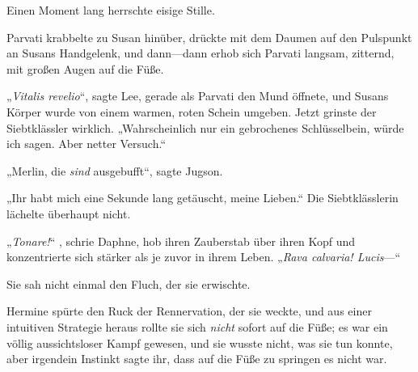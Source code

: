 Einen Moment lang herrschte eisige Stille.

Parvati krabbelte zu Susan hinüber, drückte mit dem Daumen auf den Pulspunkt an Susans Handgelenk, und dann—dann erhob sich Parvati langsam, zitternd, mit großen Augen auf die Füße.

„\emph{Vitalis revelio}“, sagte Lee, gerade als Parvati den Mund öffnete, und Susans Körper wurde von einem warmen, roten Schein umgeben. Jetzt grinste der Siebtklässler wirklich. „Wahrscheinlich nur ein gebrochenes Schlüsselbein, würde ich sagen. Aber netter Versuch.“

„Merlin, die \emph{sind} ausgebufft“, sagte Jugson.

„Ihr habt mich eine Sekunde lang getäuscht, meine Lieben.“ Die Siebtklässlerin lächelte überhaupt nicht.

„\emph{Tonare!}“ , schrie Daphne, hob ihren Zauberstab über ihren Kopf und konzentrierte sich stärker als je zuvor in ihrem Leben. „\emph{Rava calvaria! Lucis}—“

Sie sah nicht einmal den Fluch, der sie erwischte.

\later

Hermine spürte den Ruck der Rennervation, der sie weckte, und aus einer intuitiven Strategie heraus rollte sie sich \emph{nicht} sofort auf die Füße; es war ein völlig aussichtsloser Kampf gewesen, und sie wusste nicht, was sie tun konnte, aber irgendein Instinkt sagte ihr, dass auf die Füße zu springen es nicht war.

